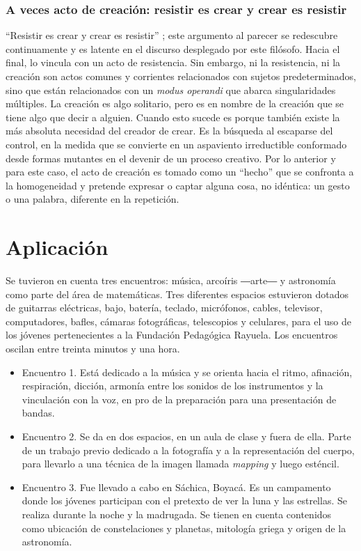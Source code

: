 \documentclass[spanish]{textolivre}
\begin{document}
\subsubsection{A veces acto de creación: resistir es crear y crear es resistir}\label{sec-acto}
“Resistir es crear y crear es resistir” \cite{deleuze_que_2007}; este argumento al parecer se redescubre continuamente y es latente en el discurso desplegado por este filósofo. Hacia el final, lo vincula con un acto de resistencia. Sin embargo, ni la resistencia, ni la creación son actos comunes y corrientes relacionados con sujetos predeterminados, sino que están relacionados con un \textit{modus operandi} que abarca singularidades múltiples. La creación es algo solitario, pero es en nombre de la creación que se tiene algo que decir a alguien. Cuando esto sucede es porque también existe la más absoluta necesidad del creador de crear. Es la búsqueda al escaparse del control, en la medida que se convierte en un aspaviento irreductible conformado desde formas mutantes en el devenir de un proceso creativo. Por lo anterior y para este caso, el acto de creación es tomado como un “hecho” que se confronta a la homogeneidad y pretende expresar o captar alguna cosa, no idéntica: un gesto o una palabra, diferente en la repetición.

\section{Aplicación}\label{sec-aplicacion}
Se tuvieron en cuenta tres encuentros: música, arcoíris ―arte― y astronomía como parte del área de matemáticas. Tres diferentes espacios estuvieron dotados de guitarras eléctricas, bajo, batería, teclado, micrófonos, cables, televisor, computadores, bafles, cámaras fotográficas, telescopios y celulares, para el uso de los jóvenes pertenecientes a la Fundación Pedagógica Rayuela. Los encuentros oscilan entre treinta minutos y una hora.

\begin{itemize}
    \item Encuentro 1. Está dedicado a la música y se orienta hacia el ritmo, afinación, respiración, dicción, armonía entre los sonidos de los instrumentos y la vinculación con la voz, en pro de la preparación para una presentación de bandas. 
    \item Encuentro 2. Se da en dos espacios, en un aula de clase y fuera de ella. Parte de un trabajo previo dedicado a la fotografía y a la representación del cuerpo, para llevarlo a una técnica de la imagen llamada \textit{mapping} y luego esténcil. 
    \item Encuentro 3. Fue llevado a cabo en Sáchica, Boyacá. Es un campamento donde los jóvenes participan con el pretexto de ver la luna y las estrellas. Se realiza durante la noche y la madrugada. Se tienen en cuenta contenidos como ubicación de constelaciones y planetas, mitología griega y origen de la astronomía.
\end{itemize}
\end{document}
